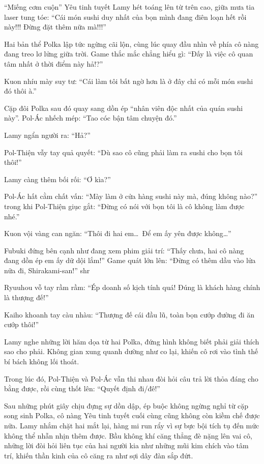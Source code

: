 \documentclass[../main.tex]{subfiles}
\begin{document}
``Miếng cơm cuộn'' Yêu tinh tuyết Lamy hét toáng lên từ trên cao, giữa mưa tia laser tung tóe: ``Cái món sushi duy nhất của bọn mình đang điên loạn hết rồi này!!! Đừng đặt thêm nữa mà!!!''

Hai bản thể Polka lập tức ngừng cãi lộn, cùng lúc quay đầu nhìn về phía cô nàng đang treo lơ lửng giữa trời. Game thắc mắc chẳng hiểu gì: ``Đấy là việc cô quan tâm nhất ở thời điểm này hả!?''

Kuon nhíu mày suy tư: ``Cái làm tôi bất ngờ hơn là ở đây chỉ có mỗi món sushi đó thôi à.''

Cặp đôi Polka sau đó quay sang dồn ép ``nhân viên độc nhất của quán sushi này''. Pol-Ác nhếch mép: ``Tao cóc bận tâm chuyện đó.''

Lamy ngẩn người ra: ``Hả?''

Pol-Thiện vẫy tay quả quyết: ``Dù sao cô cũng phải làm ra sushi cho bọn tôi thôi!''

Lamy càng thêm bối rối: ``Ơ kìa?''

Pol-Ác hất cằm chất vấn: ``Mày làm ở cửa hàng sushi này mà, đúng không nào?'' trong khi Pol-Thiện giục gắt: ``Đừng có nói với bọn tôi là cô không làm được nhé.''

Kuon vội vàng can ngăn: ``Thôi đi hai em\dots\ Để em ấy yên được không\dots''

Fubuki đứng bên cạnh như đang xem phim giải trí: ``Thấy chưa, hai cô nàng đang dồn ép em ấy dữ dội lắm!'' Game quát lớn lên: ``Đừng có thêm dầu vào lửa nữa đi, Shirakami-san!'' shr

Ryuuhou vỗ tay rầm rầm: ``Ép doanh số kịch tính quá! Đúng là khách hàng chính là thượng đế!''

Kaiho khoanh tay càu nhàu: ``Thượng đế cái đầu lũ, toàn bọn cướp đường đi ăn cướp thôi!''

Lamy nghe những lời hăm dọa từ hai Polka, đứng hình không biết phải giải thích sao cho phải. Không gian xung quanh dường như co lại, khiến cô rơi vào tình thế bí bách không lối thoát.

Trong lúc đó, Pol-Thiện và Pol-Ác vẫn thi nhau đòi hỏi câu trả lời thỏa đáng cho bằng được, rồi cùng thốt lên: ``Quyết định đi/đê!''

Sau những phút giây chịu đựng sự dồn dập, ép buộc không ngừng nghỉ từ cặp song sinh Polka, cô nàng Yêu tinh tuyết cuối cùng cũng không còn kiềm chế được nữa. Lamy nhắm chặt hai mắt lại, hàng mi run rẩy vì sự bực bội tích tụ đến mức không thể nhẫn nhịn thêm được. Bầu không khí căng thẳng đè nặng lên vai cô, những lời đòi hỏi liên tục của hai người kia như những mũi kim chích vào tâm trí, khiến thần kinh của cô căng ra như sợi dây đàn sắp đứt.
\end{document}
